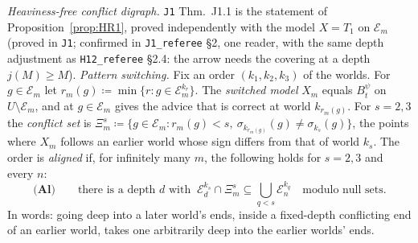 \documentclass[11pt]{article}
\theoremstyle{definition}
\theoremstyle{remark}
\newcommand{\src}[1]{\texttt{#1}}
\begin{document}
\emph{Heaviness-free conflict digraph.} \src{J1} Thm.~J1.1 is the statement of Proposition~\ref{prop:HR1}, proved independently with the model $X=T_1$ on $\mathcal E_m$ (proved in \src{J1}; confirmed in \src{J1\_referee} \S2, one reader, with the same depth adjustment as \src{H12\_referee} \S2.4: the arrow needs the covering at a depth $j(M)\ge M$). \emph{Pattern switching.} Fix an order $(k_1,k_2,k_3)$ of the worlds. For $g\in\mathcal E_m$ let $r_m(g)\coloneqq\min\{r:g\in\mathcal E^{k_r}_m\}$. The \emph{switched model} $X_m$ equals $B^\psi_t$ on $U\setminus\mathcal E_m$, and at $g\in\mathcal E_m$ gives the advice that is correct at world $k_{r_m(g)}$. For $s=2,3$ the \emph{conflict set} is $\Xi^s_m\coloneqq\{g\in\mathcal E_m:r_m(g)<s,\ \sigma_{k_{r_m(g)}}(g)\ne\sigma_{k_s}(g)\}$, the points where $X_m$ follows an earlier world whose sign differs from that of world $k_s$. The order is \emph{aligned} if, for infinitely many $m$, the following holds for $s=2,3$ and every $n$:
\[
\textbf{(Al)}\qquad\text{there is a depth $d$ with }\ \mathcal E^{k_s}_d\cap\Xi^s_m\subseteq\textstyle\bigcup_{q<s}\mathcal E^{k_q}_n\quad\text{modulo null sets.}
\]
In words: going deep into a later world's ends, inside a fixed-depth conflicting end of an earlier world, takes one arbitrarily deep into the earlier worlds' ends.
\end{document}
